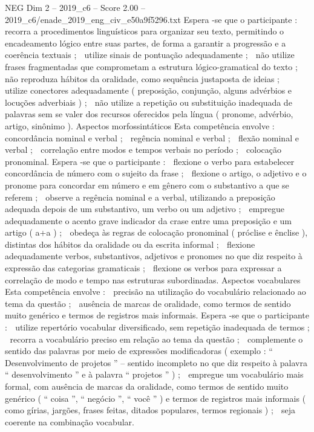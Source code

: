 \begin{textsample}{NEG Dim 2 – 2019\_c6 – Score 2.00 – 2019\_c6/enade\_2019\_eng\_civ\_e50a9f5296.txt}
Espera -se que o participante :  recorra a procedimentos linguísticos para organizar seu texto, permitindo o encadeamento lógico entre suas partes, de forma a garantir a progressão e a coerência textuais ;  utilize sinais de pontuação adequadamente ;  não utilize frases fragmentadas que comprometam a estrutura lógico-gramatical do texto ;  não reproduza hábitos da oralidade, como sequência justaposta de ideias ;  utilize conectores adequadamente ( preposição, conjunção, alguns advérbios e locuções adverbiais ) ;  não utilize a repetição ou substituição inadequada de palavras sem se valer dos recursos oferecidos pela língua ( pronome, advérbio, artigo, sinônimo ).
Aspectos morfossintáticos Esta competência envolve :  concordância nominal e verbal ;  regência nominal e verbal ;  flexão nominal e verbal ;  correlação entre modos e tempos verbais no período ;  colocação pronominal.
Espera -se que o participante :  flexione o verbo para estabelecer concordância de número com o sujeito da frase ;  flexione o artigo, o adjetivo e o pronome para concordar em número e em gênero com o substantivo a que se referem ;  observe a regência nominal e a verbal, utilizando a preposição adequada depois de um substantivo, um verbo ou um adjetivo ;  empregue adequadamente o acento grave indicador da crase entre uma preposição e um artigo ( a+a ) ;  obedeça às regras de colocação pronominal ( próclise e ênclise ), distintas dos hábitos da oralidade ou da escrita informal ;  flexione adequadamente verbos, substantivos, adjetivos e pronomes no que diz respeito à expressão das categorias gramaticais ;  flexione os verbos para expressar a correlação de modo e tempo nas estruturas subordinadas.
Aspectos vocabulares Esta competência envolve :  precisão na utilização do vocabulário relacionado ao tema da questão ;  ausência de marcas de oralidade, como termos de sentido muito genérico e termos de registros mais informais.
Espera -se que o participante :  utilize repertório vocabular diversificado, sem repetição inadequada de termos ;  recorra a vocabulário preciso em relação ao tema da questão ;  complemente o sentido das palavras por meio de expressões modificadoras ( exemplo : “ Desenvolvimento de projetos ” – sentido incompleto no que diz respeito à palavra “ desenvolvimento ” e à palavra “ projetos ” ) ;  empregue um vocabulário mais formal, com ausência de marcas da oralidade, como termos de sentido muito genérico ( “ coisa ”, “ negócio ”, “ você ” ) e termos de registros mais informais ( como gírias, jargões, frases feitas, ditados populares, termos regionais ) ;  seja coerente na combinação vocabular.

\end{textsample}
